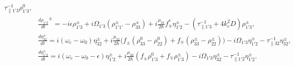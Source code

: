 \documentclass[10pt,letterpaper]{article}
\begin{document}
\begin{subequations}
\begin{align}
\tau_{\parallel 1'3}^{-1} \rho_{1'3}^{0} ,  \\
&\frac{d \rho_{1'3}}{d t} ^\pm = -i\epsilon\rho_{1'3}^\pm  +i\Omega_{1'3}(\rho_{1'1'}^{\pm} - \rho_{33}^{\pm}) +i \frac{\mu_{32}}{2 \hbar} f_{\mp}^* \eta_{1'2}^{\pm} 
- (\tau_{\parallel 1'3}^{-1} +4k_c^2 D)\rho_{1'3}^{\pm} ,\label{eq:rho13grating}\\
&\frac{d \eta_{32}^{\pm}}{d t}   = i(\omega_c - \omega_{0})\eta_{32}^{\pm} +i \frac{\mu_{32}}{2\hbar}\Big(  f_{\pm}(\rho_{33}^0-\rho_{22}^0) + f_{\mp}(\rho_{33}^\pm-\rho_{22}^\pm) \Big ) - i\Omega_{1'3}\eta_{1'2}^{\pm}
- \tau_{\parallel 32}^{-1}\eta_{32}^\pm , \\
&\frac{d \eta_{1'2}^\pm}{d t}  = i(\omega_c - \omega_{0}-\epsilon)\eta_{1'2}^{\pm} +i \frac{\mu_{32}}{2\hbar}(f_{\pm }\rho_{1'3}^0 + f_{\mp} \rho_{1'3}^{\pm}) - i\Omega_{1'3}\eta_{32}^{\pm} - \tau_{\parallel 1'2}^{-1}\eta_{1'2}^\pm.
\end{align}
\end{subequations}
\end{document}
